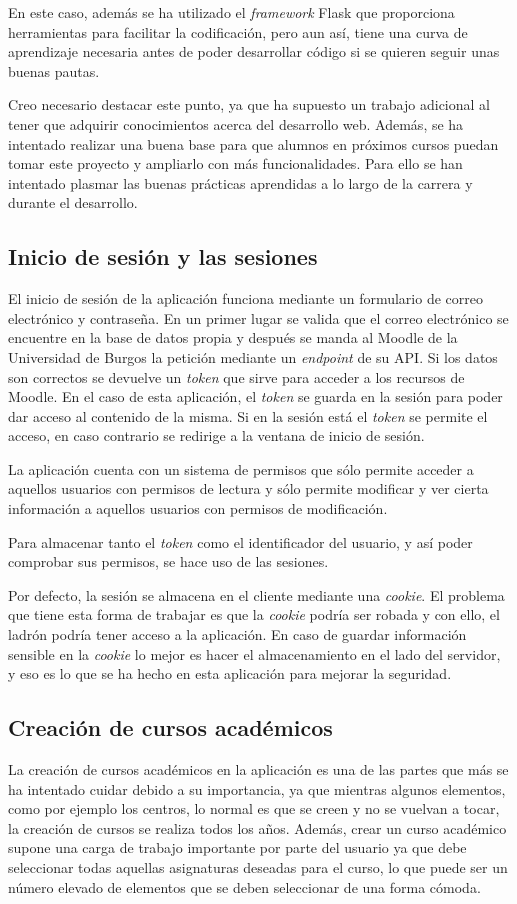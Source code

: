 En este caso, además se ha utilizado el \textit{framework} Flask que proporciona herramientas para facilitar la codificación, pero aun así, tiene una curva de aprendizaje necesaria antes de poder desarrollar código si se quieren seguir unas buenas pautas.

Creo necesario destacar este punto, ya que ha supuesto un trabajo adicional al tener que adquirir conocimientos acerca del desarrollo web.
Además, se ha intentado realizar una buena base para que alumnos en próximos cursos puedan tomar este proyecto y ampliarlo con más funcionalidades.
Para ello se han intentado plasmar las buenas prácticas aprendidas a lo largo de la carrera y durante el desarrollo.

\subsection{Inicio de sesión y las sesiones}
El inicio de sesión de la aplicación funciona mediante un formulario de correo electrónico y contraseña.
En un primer lugar se valida que el correo electrónico se encuentre en la base de datos propia y después se manda al Moodle de la Universidad de Burgos la petición mediante un \textit{endpoint} de su API. 
Si los datos son correctos se devuelve un \textit{token} que sirve para acceder a los recursos de Moodle.
En el caso de esta aplicación, el \textit{token} se guarda en la sesión para poder dar acceso al contenido de la misma.
Si en la sesión está el \textit{token} se permite el acceso, en caso contrario se redirige a la ventana de inicio de sesión.

La aplicación cuenta con un sistema de permisos que sólo permite acceder a aquellos usuarios con permisos de lectura y sólo permite modificar y ver cierta información a aquellos usuarios con permisos de modificación.

Para almacenar tanto el \textit{token} como el identificador del usuario, y así poder comprobar sus permisos, se hace uso de las sesiones.

Por defecto, la sesión se almacena en el cliente mediante una \textit{cookie}. 
El problema que tiene esta forma de trabajar es que la \textit{cookie} podría ser robada y con ello, el ladrón podría tener acceso a la aplicación. 
En caso de guardar información sensible en la \textit{cookie} lo mejor es hacer el almacenamiento en el lado del servidor, y eso es lo que se ha hecho en esta aplicación para mejorar la seguridad.

\subsection{Creación de cursos académicos}
La creación de cursos académicos en la aplicación es una de las partes que más se ha intentado cuidar debido a su importancia, ya que mientras algunos elementos, como por ejemplo los centros, lo normal es que se creen y no se vuelvan a tocar, la creación de cursos se realiza todos los años.
Además, crear un curso académico supone una carga de trabajo importante por parte del usuario ya que debe seleccionar todas aquellas asignaturas deseadas para el curso, lo que puede ser un número elevado de elementos que se deben seleccionar de una forma cómoda.

